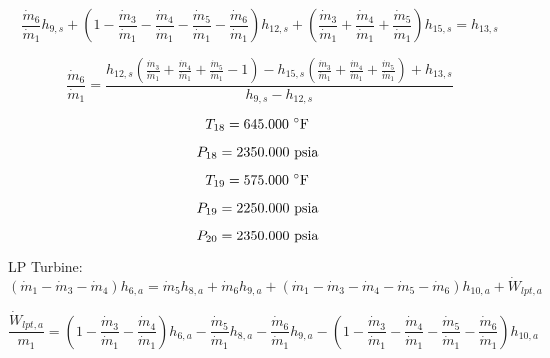 \documentclass{article}
\begin{document}
\begin{equation}
\frac{\dot{m}_{ 6}}{\dot{m}_{ 1}}h_{ 9,s} + (1 - \frac{\dot{m}_{ 3}}{\dot{m}_{ 1}} - \frac{\dot{m}_{ 4}}{\dot{m}_{ 1}} - \frac{\dot{m}_{ 5}}{\dot{m}_{ 1}} - \frac{\dot{m}_{ 6}}{\dot{m}_{ 1}})h_{12,s} + (\frac{\dot{m}_{ 3}}{\dot{m}_{ 1}} + \frac{\dot{m}_{ 4}}{\dot{m}_{ 1}} + \frac{\dot{m}_{ 5}}{\dot{m}_{ 1}})h_{15,s} = h_{13,s}
\end{equation}

\begin{equation}
\frac{\dot{m}_{ 6}}{\dot{m}_{ 1}} = \frac{h_{12,s}(\frac{\dot{m}_{3}}{\dot{m}_{1}} + \frac{\dot{m}_{4}}{\dot{m}_{1}} + \frac{\dot{m}_{5}}{\dot{m}_{1}} - 1) - h_{15,s}(\frac{\dot{m}_{3}}{\dot{m}_{1}} + \frac{\dot{m}_{4}}{\dot{m}_{1}} + \frac{\dot{m}_{5}}{\dot{m}_{1}}) + h_{13,s}}{h_{9,s} - h_{12,s}}
\end{equation}

\begin{equation}
T_{18} =  645.000\textnormal{ \(^{\circ}\)F             }
\end{equation}

\begin{equation}
P_{18} = 2350.000\textnormal{ psia                      }
\end{equation}

\begin{equation}
T_{19} =  575.000\textnormal{ \(^{\circ}\)F             }
\end{equation}

\begin{equation}
P_{19} = 2250.000\textnormal{ psia                      }
\end{equation}

\begin{equation}
P_{20} = 2350.000\textnormal{ psia                      }
\end{equation}


LP Turbine:
\begin{equation}
(\dot{m}_{ 1} - \dot{m}_{ 3} - \dot{m}_{ 4})h_{ 6,a} = \dot{m}_{ 5}h_{ 8,a} + \dot{m}_{ 6}h_{ 9,a} + (\dot{m}_{ 1} - \dot{m}_{ 3} - \dot{m}_{ 4} - \dot{m}_{ 5} - \dot{m}_{ 6})h_{10,a} + \dot{W}_{lpt,a}
\end{equation}

\begin{equation}
\frac{\dot{W}_{lpt,a}}{m_1} = (1 - \frac{\dot{m}_{ 3}}{\dot{m}_{ 1}} - \frac{\dot{m}_{ 4}}{\dot{m}_{ 1}})h_{ 6,a} - \frac{\dot{m}_{ 5}}{\dot{m}_{ 1}}h_{ 8,a} - \frac{\dot{m}_{ 6}}{\dot{m}_{ 1}}h_{ 9,a} - (1 - \frac{\dot{m}_{ 3}}{\dot{m}_{ 1}} - \frac{\dot{m}_{ 4}}{\dot{m}_{ 1}} - \frac{\dot{m}_{ 5}}{\dot{m}_{ 1}} - \frac{\dot{m}_{ 6}}{\dot{m}_{ 1}})h_{10,a}\end{equation}
\end{document}
